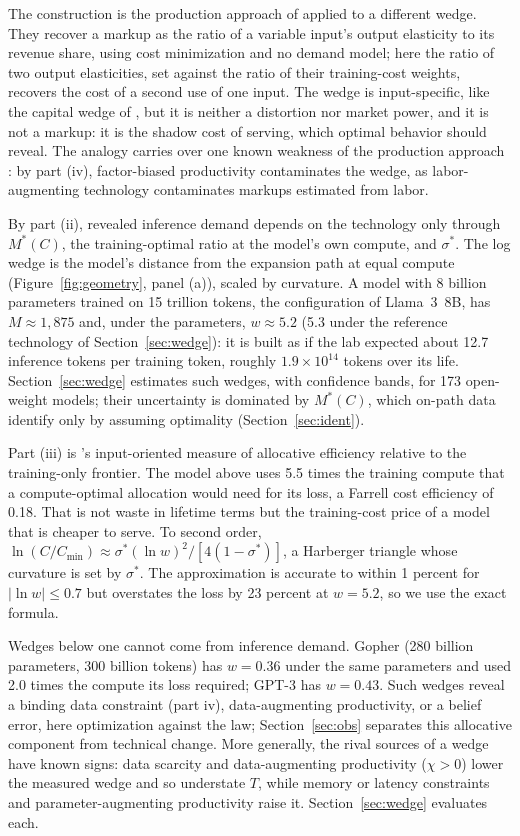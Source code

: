 The construction is the production approach of \citet{deloecker2012markups} applied to a different wedge. They
recover a markup as the ratio of a variable input's output elasticity to its revenue share, using cost minimization
and no demand model; here the ratio of two output elasticities, set against the ratio of their training-cost weights,
recovers the cost of a second use of one input. The wedge is input-specific, like the capital wedge of
\citet{hsieh2009misallocation}, but it is neither a distortion nor market power, and it is not a markup: it is the
shadow cost of serving, which optimal behavior should reveal. The analogy carries over one known weakness of the
production approach \citep{raval2023testing,demirer2020production}: by part (iv), factor-biased productivity
contaminates the wedge, as labor-augmenting technology contaminates markups estimated from labor.

By part (ii), revealed inference demand depends on the technology only through $M^*(C)$, the training-optimal ratio
at the model's own compute, and $\sigma^*$. The log wedge is the model's
distance from the expansion path at equal compute (Figure~\ref{fig:geometry}, panel (a)), scaled by curvature. A model
with 8 billion parameters trained on 15 trillion tokens, the configuration of Llama~3~8B, has $M\approx1{,}875$ and,
under the \citet{besiroglu2024chinchilla} parameters, $w\approx5.2$ (5.3 under the reference technology of
Section~\ref{sec:wedge}): it is built as if the lab expected about 12.7 inference tokens per training token, roughly $1.9\times10^{14}$ tokens over its life. Section~\ref{sec:wedge}
estimates such wedges, with confidence bands, for 173 open-weight models; their uncertainty is dominated by $M^*(C)$,
which on-path data identify only by assuming optimality (Section~\ref{sec:ident}).

Part (iii) is \citeauthor{farrell1957measurement}'s \citeyearpar{farrell1957measurement} input-oriented measure of
allocative efficiency relative to the training-only frontier. The model above uses 5.5 times the training compute
that a compute-optimal allocation would need for its loss, a Farrell cost efficiency of 0.18. That is not waste in
lifetime terms but the training-cost price of a model that is cheaper to serve. To second order,
$\ln(C/C_{\min})\approx\sigma^*(\ln w)^2/[4(1-\sigma^*)]$, a Harberger triangle whose curvature is set by $\sigma^*$.
The approximation is accurate to within 1 percent for $|\ln w|\le0.7$ but overstates the loss by 23 percent at
$w=5.2$, so we use the exact formula.

Wedges below one cannot come from inference demand. Gopher (280 billion parameters, 300 billion tokens) has $w=0.36$
under the same parameters and used 2.0 times the compute its loss required; GPT-3 has $w=0.43$. Such wedges reveal
a binding data constraint (part iv), data-augmenting productivity, or a belief error, here optimization against the
\citet{kaplan2020scaling} law; Section~\ref{sec:obs} separates this allocative component from technical change. More
generally, the rival sources of a wedge have known signs: data scarcity and data-augmenting productivity ($\chi>0$)
lower the measured wedge and so understate $T$, while memory or latency constraints and parameter-augmenting
productivity raise it. Section~\ref{sec:wedge} evaluates each.
